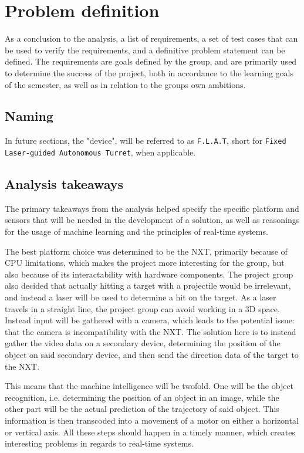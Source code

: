 \newpage
\section{Problem definition}
As a conclusion to the analysis, a list of requirements, a set of test cases that can be used to verify the requirements, and a definitive problem statement can be defined.
The requirements are goals defined by the group, and are primarily used to determine the success of the project, both in accordance to the learning goals of the semester, as well as in relation to the groups own ambitions.

\subsection{Naming}
In future sections, the "device", will be referred to as \texttt{F.L.A.T}, short for \texttt{Fixed Laser-guided Autonomous Turret}, when applicable.

\subsection{Analysis takeaways}
The primary takeaways from the analysis helped specify the specific platform and sensors that will be needed in the development of a solution, as well as reasonings for the usage of machine learning and the principles of real-time systems.

The best platform choice was determined to be the NXT, primarily because of CPU limitations, which makes the project more interesting for the group, but also because of its interactability with hardware components.
The project group also decided that actually hitting a target with a projectile would be irrelevant, and instead a laser will be used to determine a hit on the target.
As a laser travels in a straight line, the project group can avoid working in a 3D space.
Instead input will be gathered with a camera, which leads to the potential issue: that the camera is incompatibility with the NXT.
The solution here is to instead gather the video data on a secondary device, determining the position of the object on said secondary device, and then send the direction data of the target to the NXT.

This means that the machine intelligence will be twofold.
One will be the object recognition, i.e. determining the position of an object in an image, while the other part will be the actual prediction of the trajectory of said object.
This information is then transcoded into a movement of a motor on either a horizontal or vertical axis.
All these steps should happen in a timely manner, which creates interesting problems in regards to real-time systems.


